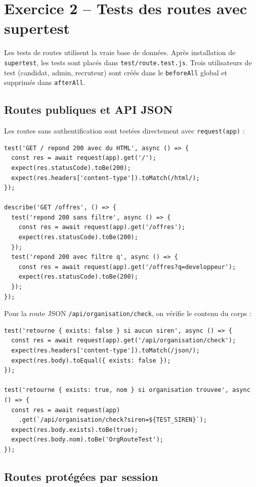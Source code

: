 \documentclass[12pt,a4paper]{article}
\begin{document}
\section{Exercice 2 -- Tests des routes avec supertest}

Les tests de routes utilisent la vraie base de données. Après installation de \texttt{supertest}, les tests sont placés dans \texttt{test/route.test.js}. Trois utilisateurs de test (candidat, admin, recruteur) sont créés dans le \texttt{beforeAll} global et supprimés dans \texttt{afterAll}.

\subsection{Routes publiques et API JSON}

Les routes sans authentification sont testées directement avec \texttt{request(app)} :

\begin{lstlisting}
test('GET / repond 200 avec du HTML', async () => {
  const res = await request(app).get('/');
  expect(res.statusCode).toBe(200);
  expect(res.headers['content-type']).toMatch(/html/);
});

describe('GET /offres', () => {
  test('repond 200 sans filtre', async () => {
    const res = await request(app).get('/offres');
    expect(res.statusCode).toBe(200);
  });
  test('repond 200 avec filtre q', async () => {
    const res = await request(app).get('/offres?q=developpeur');
    expect(res.statusCode).toBe(200);
  });
});
\end{lstlisting}

Pour la route JSON \texttt{/api/organisation/check}, on vérifie le contenu du corps :

\begin{lstlisting}
test('retourne { exists: false } si aucun siren', async () => {
  const res = await request(app).get('/api/organisation/check');
  expect(res.headers['content-type']).toMatch(/json/);
  expect(res.body).toEqual({ exists: false });
});

test('retourne { exists: true, nom } si organisation trouvee', async () => {
  const res = await request(app)
    .get(`/api/organisation/check?siren=${TEST_SIREN}`);
  expect(res.body.exists).toBe(true);
  expect(res.body.nom).toBe('OrgRouteTest');
});
\end{lstlisting}

\subsection{Routes protégées par session}
\end{document}
